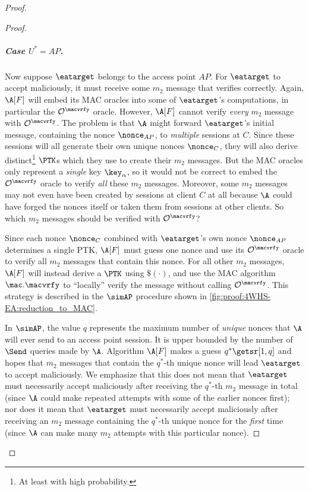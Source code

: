 \begin{proof}
\begin{proof}
\subparagraph{Case \texorpdfstring{$U^* = AP$}{U* = AP}.}
Now suppose $\eatarget$ belongs to the access point $AP$.
For $\eatarget$ to accept maliciously,
it must receive some $m_2$ message that verifies correctly.
Again,
$\A[F]$ will embed its MAC oracles into some of $\eatarget$'s computations,
in particular the $\mathcal{O}^{\macvrfy}$ oracle.
However,
$\A[F]$ cannot verify \emph{every} $m_2$ message with $\mathcal{O}^{\macvrfy}$.
The problem is that $\A$ might forward $\eatarget$'s initial message,
containing the nonce $\nonce_{AP}$,
to \emph{multiple} sessions at $C$.
Since these sessions will all generate their own unique nonces $\nonce_{C}$,
they will also derive distinct\footnote{At 
least with high probability.
} 
$\PTK$s which they use to create their $m_2$ messages.
But the MAC oracles only represent a \emph{single} key $\key_{\alpha}$,
so it would not be correct to embed the $\mathcal{O}^{\macvrfy}$ oracle to verify \emph{all} these $m_2$ messages.
Moreover,
some $m_2$ messages may not even have been created by sessions at client $C$ at all because $\A$ could have forged the nonces itself or taken them from sessions at other clients.
So which $m_2$ messages should be verified with $\mathcal{O}^{\macvrfy}$?

Since each nonce $\nonce_{C}$ combined with $\eatarget$'s own nonce $\nonce_{AP}$ determines a single PTK,
$\A[F]$ must guess one nonce and use its $\mathcal{O}^{\macvrfy}$ oracle to verify all $m_2$ messages that contain this nonce. 
For all other $m_2$ messages,
$\A[F]$ will instead derive a $\PTK$ using $\$(\cdot)$, 
and use the MAC algorithm $\mac.\macvrfy$ to ``locally'' verify the message without calling $\mathcal{O}^{\macvrfy}$.
This strategy is described in the $\simAP$ procedure shown in \cref{fig:proof:4WHS-EA:reduction_to_MAC}.  

In $\simAP$, 
the value $q$ represents the maximum number of \emph{unique} nonces that $\A$ will ever send to an access point session.
It is upper bounded by the number of $\Send$ queries made by $\A$.
Algorithm
$\A[F]$ makes a guess $q^* \getsr [1, q]$ and hopes that $m_2$ messages that contain the $q^*$-th unique nonce will lead $\eatarget$ to accept maliciously. 
We emphasize that this does not mean that $\eatarget$ must necessarily accept maliciously after receiving  the $q^*$-th $m_2$ message in total
(since $\A$ could make repeated attempts with some of the earlier nonces first); 
nor does it mean that $\eatarget$ must necessarily accept maliciously after receiving an $m_2$ message containing the $q^*$-th unique nonce for the \emph{first} time
(since $\A$ can make many $m_2$ attempts with this particular nonce). 


\end{proof}
\end{proof}
